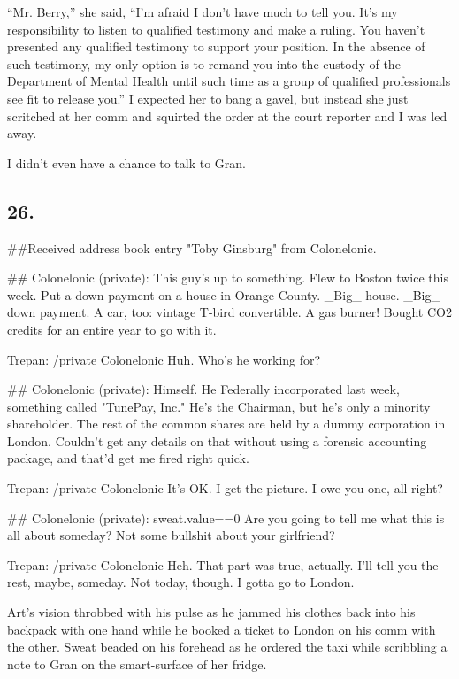 “Mr. Berry,” she said, “I’m afraid I don’t have much to tell you.
It’s my responsibility to listen to qualified testimony and make a
ruling. You haven’t presented any qualified testimony to support
your position. In the absence of such testimony, my only option is
to remand you into the custody of the Department of Mental Health
until such time as a group of qualified professionals see fit to
release you.” I expected her to bang a gavel, but instead she just
scritched at her comm and squirted the order at the court reporter
and I was led away.

I didn’t even have a chance to talk to Gran.

\subsection{26.}

\#\#Received address book entry "Toby Ginsburg" from Colonelonic.

\#\# Colonelonic (private): This guy's up to something. Flew to
Boston twice this week. Put a down payment on a house in Orange
County. \_Big\_ house. \_Big\_ down payment. A car, too: vintage
T-bird convertible. A gas burner! Bought CO2 credits for an entire
year to go with it.

Trepan: /private Colonelonic Huh. Who's he working for?

\#\# Colonelonic (private): Himself. He Federally incorporated last
week, something called "TunePay, Inc." He's the Chairman, but he's
only a minority shareholder. The rest of the common shares are held
by a dummy corporation in London. Couldn't get any details on that
without using a forensic accounting package, and that'd get me
fired right quick.

Trepan: /private Colonelonic It's OK. I get the picture. I owe you
one, all right?

\#\# Colonelonic (private): sweat.value==0 Are you going to tell me
what this is all about someday? Not some bullshit about your
girlfriend?

Trepan: /private Colonelonic Heh. That part was true, actually.
I'll tell you the rest, maybe, someday. Not today, though. I gotta
go to London.

Art’s vision throbbed with his pulse as he jammed his clothes back
into his backpack with one hand while he booked a ticket to London
on his comm with the other. Sweat beaded on his forehead as he
ordered the taxi while scribbling a note to Gran on the
smart-surface of her fridge.

